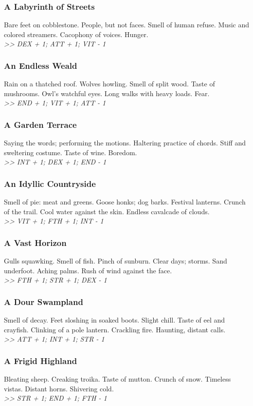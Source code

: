 \begin{multicols*}{2}
\subsubsection*{A Labyrinth of Streets}
Bare feet on cobblestone. People, but not faces. Smell of human refuse. Music and colored streamers. Cacophony of voices. Hunger.\\
\emph{>> DEX + 1; ATT + 1; VIT - 1 }

\subsubsection*{An Endless Weald}
Rain on a thatched roof. Wolves howling. Smell of split wood. Taste of mushrooms. Owl’s watchful eyes. Long walks with heavy loads. Fear.\\
\emph{>> END + 1; VIT + 1; ATT - 1 }

\subsubsection*{A Garden Terrace}
Saying the words; performing the motions. Haltering practice of chords. Stiff and sweltering costume. Taste of wine. Boredom.\\
\emph{>> INT + 1; DEX + 1; END - 1 }

\subsubsection*{An Idyllic Countryside}
Smell of pie: meat and greens. Goose honks; dog barks. Festival lanterns. Crunch of the trail. Cool water against the skin. Endless cavalcade of clouds.\\
\emph{>> VIT + 1; FTH + 1; INT - 1 }

\vspace*{\fill}
\columnbreak

\subsubsection*{A Vast Horizon}
Gulls squawking. Smell of fish. Pinch of sunburn. Clear days; storms. Sand underfoot. Aching palms. Rush of wind against the face.\\
\emph{>> FTH + 1; STR + 1; DEX - 1}

\subsubsection*{A Dour Swampland}
Smell of decay. Feet sloshing in soaked boots. Slight chill. Taste of eel and crayfish. Clinking of a pole lantern. Crackling fire. Haunting, distant calls.\\
\emph{>> ATT + 1; INT + 1; STR - 1 }

\subsubsection*{A Frigid Highland}
Bleating sheep. Creaking troika. Taste of mutton. Crunch of snow. Timeless vistas. Distant horns. Shivering cold.\\
\emph{>> STR + 1; END + 1; FTH - 1 }
\end{multicols*}

